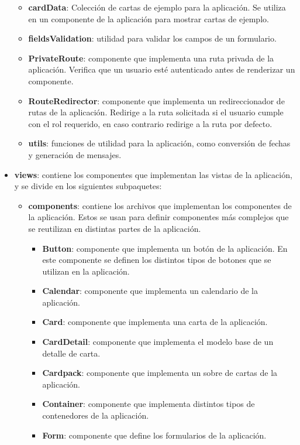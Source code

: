 \begin{itemize}
\begin{itemize}
        \item \textbf{cardData}: Colección de cartas de ejemplo para la aplicación. Se utiliza en un componente de la aplicación para mostrar cartas de ejemplo.
        \item \textbf{fieldsValidation}: utilidad para validar los campos de un formulario.
        \item \textbf{PrivateRoute}: componente que implementa una ruta privada de la aplicación. Verifica que un usuario esté autenticado antes de renderizar un componente.
        \item \textbf{RouteRedirector}: componente que implementa un redireccionador de rutas de la aplicación. Redirige a la ruta solicitada si el usuario cumple con el rol requerido, en caso contrario redirige a la ruta por defecto.
        \item \textbf{utils}: funciones de utilidad para la aplicación, como conversión de fechas y generación de mensajes.
    \end{itemize}
    \item \textbf{views}: contiene los componentes que implementan las vistas de la aplicación, y se divide en los siguientes subpaquetes:
    \begin{itemize}
        \item \textbf{components}: contiene los archivos que implementan los componentes de la aplicación. 
        Estos se usan para definir componentes más complejos que se reutilizan en distintas partes de la aplicación.
        \begin{itemize}
            \item \textbf{Button}: componente que implementa un botón de la aplicación. En este componente se definen los distintos tipos de botones que se utilizan en la aplicación.
            \item \textbf{Calendar}: componente que implementa un calendario de la aplicación.
            \item \textbf{Card}: componente que implementa una carta de la aplicación. 
            \item \textbf{CardDetail}: componente que implementa el modelo base de un detalle de carta.
            \item \textbf{Cardpack}: componente que implementa un sobre de cartas de la aplicación.
            \item \textbf{Container}: componente que implementa distintos tipos de contenedores de la aplicación.
            \item \textbf{Form}: componente que define los formularios de la aplicación.

\end{itemize}
\end{itemize}
\end{itemize}
